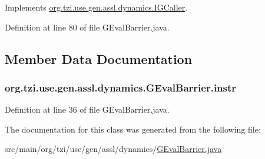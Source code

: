 Implements \hyperlink{interfaceorg_1_1tzi_1_1use_1_1gen_1_1assl_1_1dynamics_1_1_i_g_caller_a5d86832a783f44ce72eaacd64e207330}{org.\-tzi.\-use.\-gen.\-assl.\-dynamics.\-I\-G\-Caller}.



Definition at line 80 of file G\-Eval\-Barrier.\-java.



\subsection{Member Data Documentation}
\hypertarget{classorg_1_1tzi_1_1use_1_1gen_1_1assl_1_1dynamics_1_1_g_eval_barrier_a7ef56806ef434bfab29fd9788b294696}{
\subsubsection[{instr}]{ org.\-tzi.\-use.\-gen.\-assl.\-dynamics.\-G\-Eval\-Barrier.\-instr\hspace{0.3cm}{\ttfamily [protected]}}}\label{classorg_1_1tzi_1_1use_1_1gen_1_1assl_1_1dynamics_1_1_g_eval_barrier_a7ef56806ef434bfab29fd9788b294696}


Definition at line 36 of file G\-Eval\-Barrier.\-java.



The documentation for this class was generated from the following file\-:\begin{DoxyCompactItemize}
\item 
src/main/org/tzi/use/gen/assl/dynamics/\hyperlink{_g_eval_barrier_8java}{G\-Eval\-Barrier.\-java}\end{DoxyCompactItemize}
